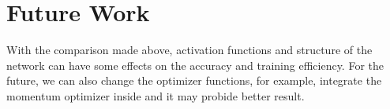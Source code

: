 \documentclass{article}
\begin{document}
	\section{Future Work}
	\par With the comparison made above, activation functions and structure of the network can have some effects on the accuracy and training efficiency. For the future, we can also change the optimizer functions, for example, integrate the momentum optimizer inside and it may probide better result.
\end{document}
